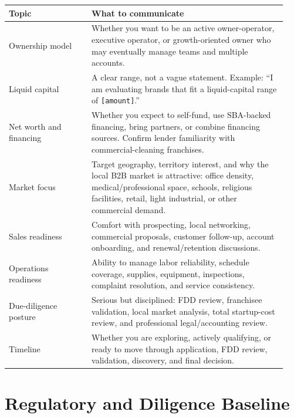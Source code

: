 \documentclass[11pt]{article}
\newcommand{\placeholder}[1]{\textcolor{accent}{\texttt{[#1]}}}
\begin{document}
\begin{longtable}{>{\raggedright\arraybackslash}p{0.28\linewidth}>{\raggedright\arraybackslash}p{0.66\linewidth}}
\toprule
\textbf{Topic} & \textbf{What to communicate} \\
\midrule
Ownership model & Whether you want to be an active owner-operator, executive operator, or growth-oriented owner who may eventually manage teams and multiple accounts. \\
Liquid capital & A clear range, not a vague statement. Example: ``I am evaluating brands that fit a liquid-capital range of \placeholder{amount}.'' \\
Net worth and financing & Whether you expect to self-fund, use SBA-backed financing, bring partners, or combine financing sources. Confirm lender familiarity with commercial-cleaning franchises. \\
Market focus & Target geography, territory interest, and why the local B2B market is attractive: office density, medical/professional space, schools, religious facilities, retail, light industrial, or other commercial demand. \\
Sales readiness & Comfort with prospecting, local networking, commercial proposals, customer follow-up, account onboarding, and renewal/retention discussions. \\
Operations readiness & Ability to manage labor reliability, schedule coverage, supplies, equipment, inspections, complaint resolution, and service consistency. \\
Due-diligence posture & Serious but disciplined: FDD review, franchisee validation, local market analysis, total startup-cost review, and professional legal/accounting review. \\
Timeline & Whether you are exploring, actively qualifying, or ready to move through application, FDD review, validation, discovery, and final decision. \\
\bottomrule
\end{longtable}

\section{Regulatory and Diligence Baseline}
\end{document}
